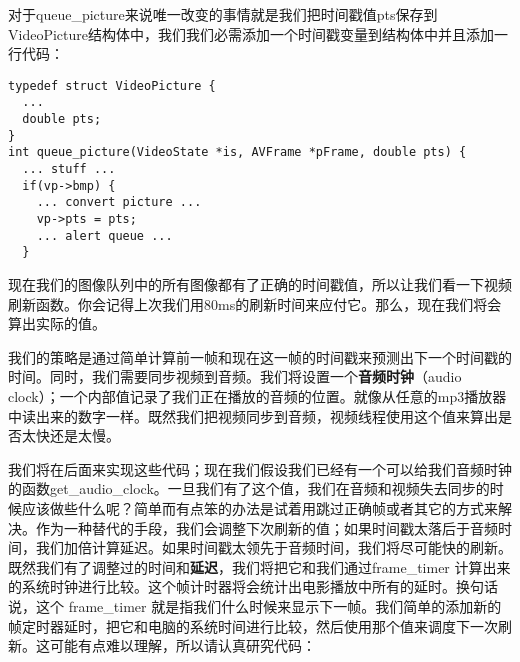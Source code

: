 对于queue_picture来说唯一改变的事情就是我们把时间戳值pts保存到VideoPicture结构体中，我们我们必需添加一个时间戳变量到结构体中并且添加一行代码：

\begin{lstlisting}
typedef struct VideoPicture {
  ...
  double pts;
}
int queue_picture(VideoState *is, AVFrame *pFrame, double pts) {
  ... stuff ...
  if(vp->bmp) {
    ... convert picture ...
    vp->pts = pts;
    ... alert queue ...
  }
\end{lstlisting}

现在我们的图像队列中的所有图像都有了正确的时间戳值，所以让我们看一下视频刷新函数。你会记得上次我们用80ms的刷新时间来应付它。那么，现在我们将会算出实际的值。

我们的策略是通过简单计算前一帧和现在这一帧的时间戳来预测出下一个时间戳的时间。同时，我们需要同步视频到音频。我们将设置一个\textbf{音频时钟}（audio clock）；一个内部值记录了我们正在播放的音频的位置。就像从任意的mp3播放器中读出来的数字一样。既然我们把视频同步到音频，视频线程使用这个值来算出是否太快还是太慢。

我们将在后面来实现这些代码；现在我们假设我们已经有一个可以给我们音频时钟的函数get_audio_clock。一旦我们有了这个值，我们在音频和视频失去同步的时候应该做些什么呢？简单而有点笨的办法是试着用跳过正确帧或者其它的方式来解决。作为一种替代的手段，我们会调整下次刷新的值；如果时间戳太落后于音频时间，我们加倍计算延迟。如果时间戳太领先于音频时间，我们将尽可能快的刷新。既然我们有了调整过的时间和\textbf{延迟}，我们将把它和我们通过frame_timer 计算出来的系统时钟进行比较。这个帧计时器将会统计出电影播放中所有的延时。换句话说，这个 frame_timer 就是指我们什么时候来显示下一帧。我们简单的添加新的帧定时器延时，把它和电脑的系统时间进行比较，然后使用那个值来调度下一次刷新。这可能有点难以理解，所以请认真研究代码：

